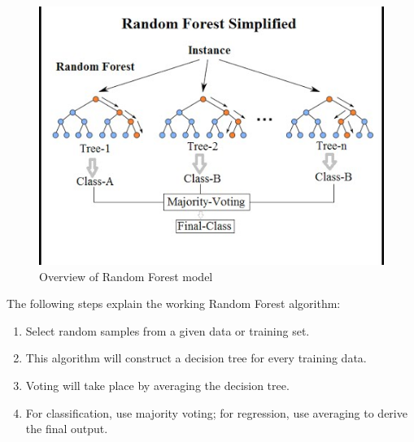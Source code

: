 \documentclass{ieeeojies}
\begin{document}
\begin{figure}[H]
	\centering
	\begin{minipage}{0.23\textwidth}
		\centering
		\includegraphics[width=1\textwidth]{bibliography/Images/RandomForest_Img2.png}
		\caption{Overview of Random Forest model}
		\label{fig:1}
	\end{minipage}
\end{figure}
The following steps explain the working Random Forest algorithm:
\begin{enumerate}
	\item Select random samples from a given data or training set.
	\item This algorithm will construct a decision tree for every training data.
	\item Voting will take place by averaging the decision tree.
	\item For classification, use majority voting; for regression, use averaging to derive the final output.
\end{enumerate}
\end{document}
